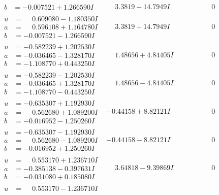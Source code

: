 \documentclass[1p]{elsarticle_modified}
\theoremstyle{definition}
\begin{document}
$$\begin{array}{c|c|c}
\begin{aligned}
b &= -0.007521 + 1.266590 I\end{aligned}
 & \phantom{-}3.3819 - 14.7949 I & \phantom{-0.000000 } 0 \\ \hline\begin{aligned}
u &= \phantom{-}0.609080 - 1.180350 I \\
a &= \phantom{-}0.596108 + 1.164780 I \\
b &= -0.007521 - 1.266590 I\end{aligned}
 & \phantom{-}3.3819 + 14.7949 I & \phantom{-0.000000 } 0 \\ \hline\begin{aligned}
u &= -0.582239 + 1.202530 I \\
a &= -0.036465 - 1.328170 I \\
b &= -1.108770 + 0.443250 I\end{aligned}
 & \phantom{-}1.48656 + 4.84405 I & \phantom{-0.000000 } 0 \\ \hline\begin{aligned}
u &= -0.582239 - 1.202530 I \\
a &= -0.036465 + 1.328170 I \\
b &= -1.108770 - 0.443250 I\end{aligned}
 & \phantom{-}1.48656 - 4.84405 I & \phantom{-0.000000 } 0 \\ \hline\begin{aligned}
u &= -0.635307 + 1.192930 I \\
a &= \phantom{-}0.562680 + 1.089200 I \\
b &= -0.016952 - 1.250260 I\end{aligned}
 & -0.44158 + 8.82121 I & \phantom{-0.000000 } 0 \\ \hline\begin{aligned}
u &= -0.635307 - 1.192930 I \\
a &= \phantom{-}0.562680 - 1.089200 I \\
b &= -0.016952 + 1.250260 I\end{aligned}
 & -0.44158 - 8.82121 I & \phantom{-0.000000 } 0 \\ \hline\begin{aligned}
u &= \phantom{-}0.553170 + 1.236710 I \\
a &= -0.385138 - 0.397631 I \\
b &= -0.031080 + 0.185080 I\end{aligned}
 & \phantom{-}3.64818 - 9.39869 I & \phantom{-0.000000 } 0 \\ \hline\begin{aligned}
u &= \phantom{-}0.553170 - 1.236710 I \\

\end{aligned}
\end{array}$$
\end{document}

